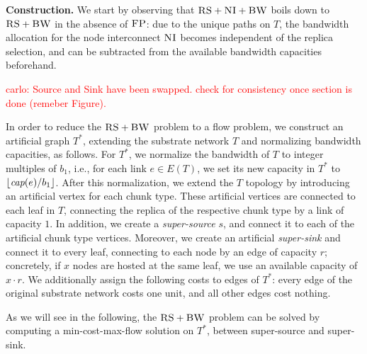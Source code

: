 \documentclass[9pt]{sigcomm-alternate}
\newcommand{\carlo}[1]{\textcolor{red}{carlo: #1}}
\newcommand{\MaFactor}{r}
\newcommand{\Source}{\ensuremath{s}}
\newcommand{\capacity}{\emph{cap}}
\newcommand{\CC}{\textsc{NI}}
\newcommand{\FP}{\textsc{FP}}
\newcommand{\RS}{\textsc{RS}}
\newcommand{\BW}{\textsc{BW}}
\newcommand{\Tree}{\ensuremath{T}}
\newcommand{\CostTrans}{\ensuremath{b_1}}
\begin{document}

\textbf{Construction.}
We start by observing that $\RS+\CC+\BW$ boils down to
$\RS+\BW$ in the absence of $\FP$: due to the unique paths
on $\Tree$, the bandwidth allocation for the node interconnect
$\CC$ becomes independent of the replica selection, and can be subtracted
from the available bandwidth capacities beforehand.

\carlo{Source and Sink have been swapped. check for consistency once section is
done (remeber Figure).}

In order to reduce the $\RS+\BW$ problem to a flow problem, we construct
an artificial graph $\Tree^*$, extending the substrate network $\Tree$ and
normalizing bandwidth capacities, as follows. For $\Tree^*$,
we normalize the bandwidth of $\Tree$ to integer multiples of $\CostTrans$,
i.e., for each link $e\in E(\Tree)$, we set its new
capacity in $\Tree^*$ to $\lfloor\capacity(e)/\CostTrans\rfloor$. 
After this normalization, we extend the $\Tree$ topology by
introducing an artificial vertex for each chunk type. These artificial
vertices are connected to each leaf in $\Tree$,
connecting the replica of the respective chunk type by a link of capacity $1$. In
addition, we create a
\emph{super-source} $\Source$, and connect it to each of the artificial chunk
type vertices. Moreover, we create an artificial \emph{super-sink} and
connect it to every leaf, connecting to each node by an edge of capacity $\MaFactor$; 
concretely, if $x$ nodes are hosted at the same leaf, we use an available capacity of 
$x \cdot \MaFactor$.
We additionally assign the following costs to edges of $\Tree^*$:
every edge of the original substrate network costs one unit, and all other edges
cost nothing.

As we will see in the following, the $\RS+\BW$ problem can be solved by computing
a min-cost-max-flow solution on $\Tree^*$, between super-source and super-sink. 
\end{document}
